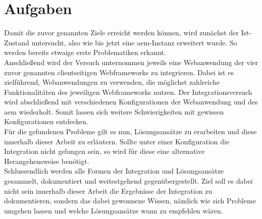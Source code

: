 \section{Aufgaben}
Damit die zuvor genannten Ziele erreicht werden können, wird zunächst der Ist-Zustand untersucht, also wie bis jetzt eine \ac{aem}-Instanz erweitert wurde. So werden bereits etwaige erste Problematiken erkannt.\\
Anschließend wird der Versuch unternommen jeweils eine Webanwendung der vier zuvor genannten clientseitigen Webframeworks zu integrieren. Dabei ist es zielführend, Webanwendungen zu verwenden, die möglichst zahlreiche Funktionalitäten des jeweiligen Webframeworks nutzen. Der Integrationsversuch wird abschließend mit verschiedenen Konfigurationen der Webanwendung und des \ac{aem} wiederholt. Somit lassen sich weitere Schwierigkeiten mit gewissen Konfigurationen entdecken. \\
Für die gefundenen Probleme gilt es nun, Lösungsansätze zu erarbeiten und diese innerhalb dieser Arbeit zu erläutern. Sollte unter einer Konfiguration die Integration nicht gelungen sein, so wird für diese eine alternative Herangehensweise benötigt.\\
Schlussendlich werden alle Formen der Integration und Lösungsansätze gesammelt, dokumentiert und weitestgehend gegenübergestellt. Ziel soll es dabei nicht sein innerhalb dieser Arbeit die Ergebnisse der Integration zu dokumentieren, sondern das dabei gewonnene Wissen, nämlich wie sich Probleme umgehen lassen und welche Lösungsansätze wann zu empfehlen wären.



